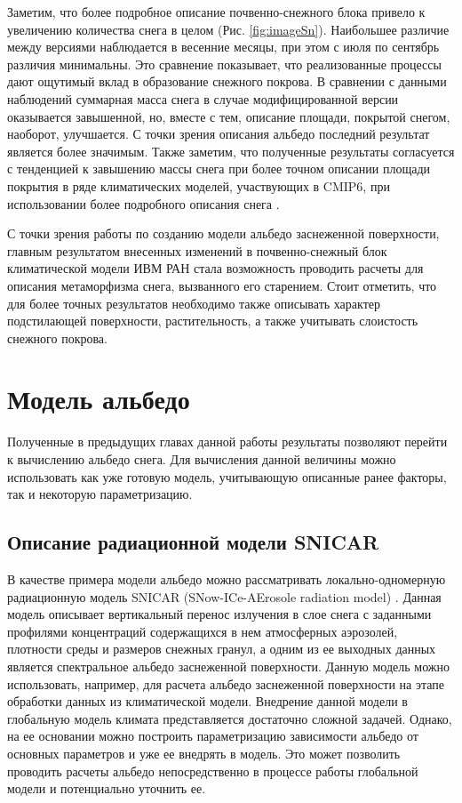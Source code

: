 \documentclass[a4paper, fontsize=14pt]{scrartcl}
\begin{document}
Заметим, что более подробное описание почвенно-снежного блока привело к увеличению количества снега в целом (Рис. \ref{fig:imageSn}). Наибольшее различие между версиями наблюдается в весенние месяцы, при этом с июля по сентябрь различия минимальны. Это сравнение показывает, что реализованные процессы дают ощутимый вклад в образование снежного покрова.  В сравнении с данными наблюдений суммарная масса снега в случае модифицированной версии оказывается завышенной, но, вместе с тем, описание площади, покрытой снегом, наоборот, улучшается. С точки зрения описания альбедо последний результат является более значимым. Также заметим, что полученные результаты согласуется с тенденцией к завышению массы снега при более точном описании площади покрытия в ряде климатических моделей, участвующих в CMIP6, при использовании более подробного описания снега \cite{Mudryk2020}.


С точки зрения работы по созданию модели альбедо заснеженной поверхности, главным результатом внесенных изменений в почвенно-снежный блок климатической модели ИВМ РАН стала возможность проводить расчеты для описания метаморфизма снега, вызванного его старением. Стоит отметить, что для более точных результатов необходимо также описывать характер подстилающей поверхности, растительность, а также учитывать слоистость снежного покрова.


\newpage
\section{Модель альбедо}

Полученные в предыдущих главах данной работы результаты позволяют перейти к вычислению альбедо снега. Для вычисления данной величины можно использовать как уже готовую модель, учитывающую описанные ранее факторы, так и некоторую параметризацию. 

\subsection{Описание радиационной модели SNICAR}
В качестве примера модели альбедо можно рассматривать локально-одномерную радиационную модель SNICAR (SNow-ICe-AErosole radiation model) \cite{Flanner2007}. Данная модель описывает вертикальный перенос излучения в слое снега с заданными профилями концентраций содержащихся в нем атмосферных аэрозолей, плотности среды и размеров снежных гранул, а одним из ее выходных данных является спектральное альбедо заснеженной поверхности. Данную модель можно использовать, например, для расчета альбедо заснеженной поверхности на этапе обработки данных из климатической модели. Внедрение данной модели в глобальную модель климата представляется достаточно сложной задачей. Однако, на ее основании можно построить параметризацию зависимости альбедо от основных параметров и уже ее внедрять в модель. Это может позволить проводить расчеты альбедо непосредственно в процессе работы глобальной модели и потенциально уточнить ее.
\end{document}
